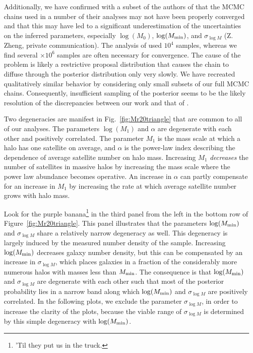\documentclass[usenatbib,usegraphicx,letterpaper]{mn2e}
\begin{document}
Additionally, we have confirmed with a subset of the authors of \citet{zehavi_etal11}
that the MCMC chains used in a number of their analyses may not have been
properly converged and that this may have led to a significant underestimation of the
uncertainties on the inferred parameters, especially $\log (M_0)$, $\log (M_{\rm min})$,
and $\sigma_{\log M}$ (Z. Zheng, private communication). The analysis of \citet{zehavi_etal11}
used $10^4$ samples, whereas we find several $\times 10^6$ samples are often necessary for convergence.
The cause of the problem is likely a restrictive proposal distribution that causes the chain to
diffuse through the posterior distribution only very slowly. We have recreated qualitatively similar
behavior by considering only small subsets of our full MCMC chains. Consequently, insufficient
sampling of the posterior seems to be the likely resolution
of the discrepancies between our work and that of \citet{zehavi_etal11}.

Two degeneracies are manifest in Fig.~\ref{fig:Mr20triangle} that are common to all of our
analyses. The parameters $\log (M_1)$ and $\alpha$ are degenerate with each other and positively
correlated. The parameter $M_1$ is the mass scale at which a halo has one satellite on
average, and $\alpha$ is the power-law index describing the dependence of average satellite
number on halo mass. Increasing $M_1$ {\em decreases} the number of satellites in massive halos
by increasing the mass scale where the power law abundance becomes operative. An increase in $\alpha$ can partly
compensate for an increase in $M_1$ by increasing the rate at which average satellite number
grows with halo mass.

Look for the purple banana\footnote{'Til they put us in the truck.} in the third panel from the left in the bottom row of
Figure~\ref{fig:Mr20triangle}. This panel illustrates that the parameters
$\log (M_{\rm min})$ and $\sigma_{\log M}$ share a relatively narrow degeneracy as well.
This degeneracy is largely induced by the measured
number density of the sample. Increasing $\log (M_{\rm min})$ decreases galaxy
number density, but this can be compensated by an increase in $\sigma_{\log M}$, which
places galaxies in a fraction of the considerably more numerous halos with masses less
than $M_{\rm min}$. The consequence is that $\log (M_{\rm min})$ and $\sigma_{\log M}$ are
degenerate with each other such that most of the posterior probability lies in a narrow band
along which $\log (M_{\rm min})$ and $\sigma_{\log M}$ are positively correlated.
In the following plots, we exclude the parameter $\sigma_{\log M}$,
in order to increase the clarity of the plots, because the viable range of $\sigma_{\log M}$ is
determined by this simple degeneracy with $\log (M_{\rm min})$.
\end{document}
